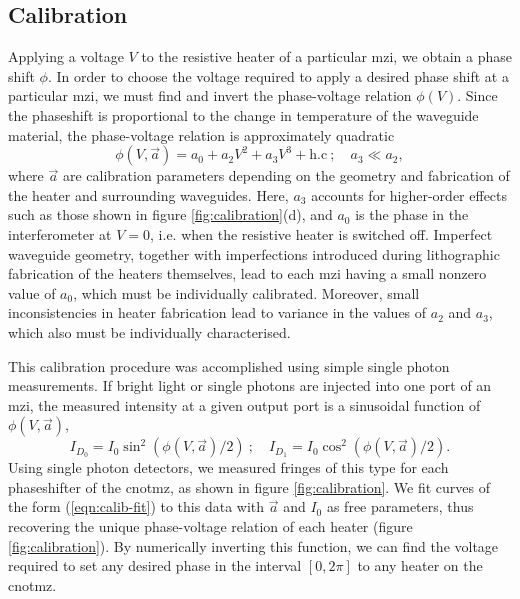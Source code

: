 \subsection{Calibration}
\label{sec:cnot-mz-calibration}
Applying a voltage $V$ to the resistive heater of a particular \gls{mzi}, we obtain a phase shift $\phi$. 
In order to choose the voltage required to apply a desired phase shift at a particular \gls{mzi}, we must find and invert the phase-voltage relation $\phi(V)$.
Since the phaseshift is proportional to the change in temperature of the waveguide material, the phase-voltage relation is approximately quadratic
\begin{equation}
    \phi(V, \vec{a}) = a_0 + a_2 V^2 + a_3 V^3 + \mathrm{h.c} ~; \quad a_3 \ll a_2,
\end{equation}
where $\vec{a}$ are calibration parameters depending on the geometry and fabrication of the heater and surrounding waveguides.
Here, $a_3$ accounts for higher-order effects such as those shown in figure \ref{fig:calibration}(d), and $a_0$ is the phase in the interferometer at $V=0$, i.e. when the resistive heater is switched off. Imperfect waveguide geometry, together with imperfections introduced during lithographic fabrication of the heaters themselves, lead to each \gls{mzi} having a small nonzero value of $a_0$, which must be individually calibrated. Moreover, small inconsistencies in heater fabrication lead to variance in the values of $a_2$ and $a_3$, which also must be individually characterised.

This calibration procedure was accomplished using simple single photon measurements.
If bright light or single photons are injected into one port of an \gls{mzi}, the measured intensity at a given output port is a sinusoidal function of $\phi(V, \vec{a})$,
\begin{equation}
 I_{D_0} = I_0 \sin^2 \left(\phi(V, \vec{a})/2 \right)~; \quad
 I_{D_1} = I_0 \cos^2 \left(\phi(V, \vec{a})/2 \right).
 \label{eqn:calib-fit}
\end{equation}
Using single photon detectors, we measured fringes of this type for each phaseshifter of the \gls{cnotmz}, as shown in figure \ref{fig:calibration}. We fit curves of the form (\ref{eqn:calib-fit}) to this data with $\vec{a}$ and $I_0$ as free parameters, thus recovering the unique phase-voltage relation of each heater (figure \ref{fig:calibration}). By numerically inverting this function, we can find the voltage required to set any desired phase in the interval $\left[0, 2\pi\right]$ to any heater on the \gls{cnotmz}.

